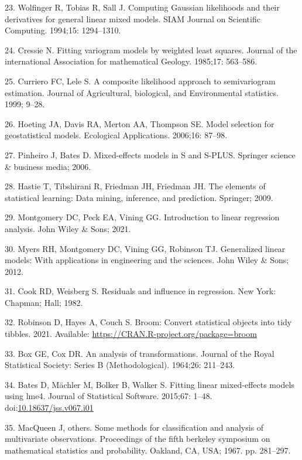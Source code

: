 \documentclass[10pt,letterpaper]{article}
\begin{document}
\leavevmode\hypertarget{ref-wolfinger1994computing}{}%
23. Wolfinger R, Tobias R, Sall J. Computing Gaussian likelihoods and
their derivatives for general linear mixed models. SIAM Journal on
Scientific Computing. 1994;15: 1294--1310.

\leavevmode\hypertarget{ref-cressie1985fitting}{}%
24. Cressie N. Fitting variogram models by weighted least squares.
Journal of the international Association for mathematical Geology.
1985;17: 563--586.

\leavevmode\hypertarget{ref-curriero1999composite}{}%
25. Curriero FC, Lele S. A composite likelihood approach to
semivariogram estimation. Journal of Agricultural, biological, and
Environmental statistics. 1999; 9--28.

\leavevmode\hypertarget{ref-hoeting2006model}{}%
26. Hoeting JA, Davis RA, Merton AA, Thompson SE. Model selection for
geostatistical models. Ecological Applications. 2006;16: 87--98.

\leavevmode\hypertarget{ref-pinheiro2006mixed}{}%
27. Pinheiro J, Bates D. Mixed-effects models in S and S-PLUS. Springer
science \& business media; 2006.

\leavevmode\hypertarget{ref-hastie2009elements}{}%
28. Hastie T, Tibshirani R, Friedman JH, Friedman JH. The elements of
statistical learning: Data mining, inference, and prediction. Springer;
2009.

\leavevmode\hypertarget{ref-montgomery2021introduction}{}%
29. Montgomery DC, Peck EA, Vining GG. Introduction to linear regression
analysis. John Wiley \& Sons; 2021.

\leavevmode\hypertarget{ref-myers2012generalized}{}%
30. Myers RH, Montgomery DC, Vining GG, Robinson TJ. Generalized linear
models: With applications in engineering and the sciences. John Wiley \&
Sons; 2012.

\leavevmode\hypertarget{ref-cook1982residuals}{}%
31. Cook RD, Weisberg S. Residuals and influence in regression. New
York: Chapman; Hall; 1982.

\leavevmode\hypertarget{ref-robinson2021broom}{}%
32. Robinson D, Hayes A, Couch S. Broom: Convert statistical objects
into tidy tibbles. 2021. Available:
\url{https://CRAN.R-project.org/package=broom}

\leavevmode\hypertarget{ref-box1964analysis}{}%
33. Box GE, Cox DR. An analysis of transformations. Journal of the Royal
Statistical Society: Series B (Methodological). 1964;26: 211--243.

\leavevmode\hypertarget{ref-bates2015lme4}{}%
34. Bates D, Mächler M, Bolker B, Walker S. Fitting linear mixed-effects
models using lme4. Journal of Statistical Software. 2015;67: 1--48.
doi:\href{https://doi.org/10.18637/jss.v067.i01}{10.18637/jss.v067.i01}

\leavevmode\hypertarget{ref-macqueen1967some}{}%
35. MacQueen J, others. Some methods for classification and analysis of
multivariate observations. Proceedings of the fifth berkeley symposium
on mathematical statistics and probability. Oakland, CA, USA; 1967. pp.
281--297.

\nolinenumbers
\end{document}
